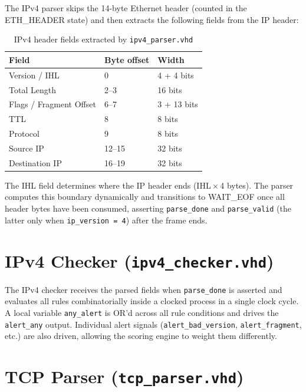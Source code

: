 \documentclass[12pt, a4paper]{report}
\begin{document}
The IPv4 parser skips the 14-byte Ethernet header (counted in the ETH\_HEADER state) and then extracts the following fields from the IP header:

\begin{table}[H]
\centering
\caption{IPv4 header fields extracted by \texttt{ipv4\_parser.vhd}}
\label{tab:ipv4fields}
\begin{tabular}{lll}
\toprule
\textbf{Field} & \textbf{Byte offset} & \textbf{Width} \\
\midrule
Version / IHL   & 0      & 4 + 4 bits \\
Total Length    & 2--3   & 16 bits    \\
Flags / Fragment Offset & 6--7 & 3 + 13 bits \\
TTL             & 8      & 8 bits     \\
Protocol        & 9      & 8 bits     \\
Source IP       & 12--15 & 32 bits    \\
Destination IP  & 16--19 & 32 bits    \\
\bottomrule
\end{tabular}
\end{table}

The IHL field determines where the IP header ends (IHL\,$\times$\,4 bytes). The parser computes this boundary dynamically and transitions to WAIT\_EOF once all header bytes have been consumed, asserting \texttt{parse\_done} and \texttt{parse\_valid} (the latter only when \texttt{ip\_version = 4}) after the frame ends.

\section{IPv4 Checker (\texttt{ipv4\_checker.vhd})}

The IPv4 checker receives the parsed fields when \texttt{parse\_done} is asserted and evaluates all rules combinatorially inside a clocked process in a single clock cycle. A local variable \texttt{any\_alert} is OR'd across all rule conditions and drives the \texttt{alert\_any} output. Individual alert signals (\texttt{alert\_bad\_version}, \texttt{alert\_fragment}, etc.) are also driven, allowing the scoring engine to weight them differently.

\section{TCP Parser (\texttt{tcp\_parser.vhd})}
\end{document}
